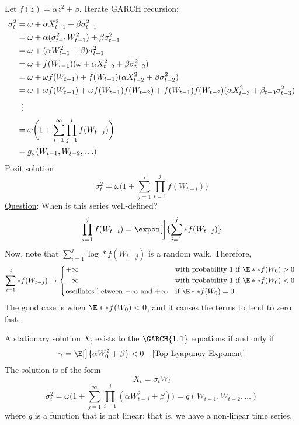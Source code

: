 Let $ f(z)=\alpha z^2+\beta $.
Iterate GARCH recursion:
\begin{align*}
    \sigma_t^2
     & =\omega+\alpha X_{t-1}^2+\beta \sigma_{t-1}^2                                                                          \\
     & =\omega+\alpha(\sigma_{t-1}^2 W_{t-1}^2)+\beta \sigma_{t-1}^2                                                          \\
     & =\omega+(\alpha W_{t-1}^2+\beta)\sigma_{t-1}^2                                                                         \\
     & =\omega+f(W_{t-1})(\omega+\alpha X_{t-2}^2+\beta \sigma_{t-2}^2)                                                       \\
     & =\omega+\omega f(W_{t-1})+f(W_{t-1})(\alpha X_{t-2}^2+\beta \sigma_{t-2}^2)                                            \\
     & =\omega+\omega f(W_{t-1})+\omega f(W_{t-1})f(W_{t-2})+f(W_{t-1})f(W_{t-2})(\alpha X_{t-3}^2+\beta_{t-3}\sigma_{t-3}^2) \\
     & \vdotswithin{=}                                                                                                        \\
     & =\omega\biggl(1+\sum_{i=1}^{\infty} \prod_{j=1}^i f(W_{t-j})\biggr)                                                    \\
     & =g_\sigma (W_{t-1},W_{t-2},\ldots)
\end{align*}
Posit solution
\[ \sigma_t^2=\omega\biggl(1+\sum_{j=1}^{\infty} \prod_{i=1}^j f(W_{t-i})\biggr) \]
\underline{Question}: When is this series well-defined?
\[ \prod_{i=1}^j f(W_{t-i})=\expon[\bigg]{\sum_{i=1}^{j} \log*{f(W_{t-j})}} \]
Now, note that $ \sum_{i=1}^{j} \log*{f(W_{t-j})} $ is a random walk. Therefore,
\[ \sum_{i=1}^{j} \log*{f(W_{t-j})}\to
    \begin{cases*}
        +\infty                                               & with probability $ 1 $ if $ \E*{\log*{f(W_0)}}>0 $ \\
        -\infty                                               & with probability $ 1 $ if $ \E*{\log*{f(W_0)}}<0 $ \\
        \text{oscillates between $ -\infty $ and $ +\infty $} & if $\E*{\log*{f(W_0)}}=0$
    \end{cases*} \]
The good case is when $ \E*{\log*{f(W_0)}}<0 $, and it causes the terms to tend to zero fast.
\begin{Theorem}{}{}
    A stationary solution $ X_t $ exists to the $ \GARCH{1,1} $ equations if and only if
    \[ \gamma=\E[\big]{\log{\alpha W_0^2+\beta}}<0\quad\text{[Top Lyapunov Exponent]} \]
    The solution is of the form
    \[ X_t=\sigma_t W_t \]
    \[ \sigma_t^2=\omega\biggl(1+\sum_{j=1}^{\infty} \prod_{i=1}^j (\alpha W_{t-j}^2+\beta)\biggr)=
        g(W_{t-1},W_{t-2},\ldots) \]
    where $ g $ is a function that is not linear; that is, we have a non-linear time series.
\end{Theorem}
